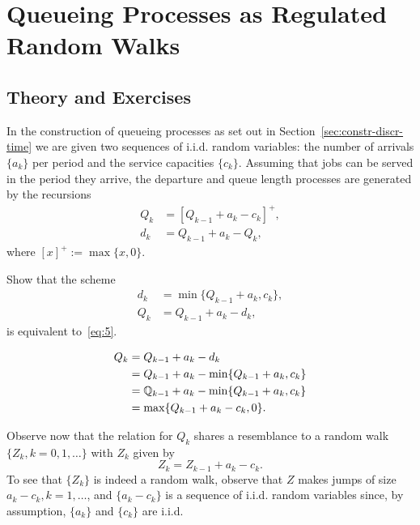 \section{Queueing Processes as Regulated Random Walks}
\label{sec:queu-proc-as}

\subsection*{Theory and Exercises}




In the construction of queueing processes as set out in
Section~\ref{sec:constr-discr-time} we are given two sequences of
i.i.d. random variables: the number of arrivals $\{a_k\}$ per period
and the service capacities $\{c_k\}$. Assuming that jobs can be served
in the period they arrive, the departure and queue length processes
are generated by the recursions
\begin{equation}\label{eq:5}
  \begin{split}
  Q_k &= [Q_{k-1}+a_k - c_k]^+,\\
  d_k &= Q_{k-1} +a_k- Q_{k},
  \end{split}
\end{equation}
where $[x]^+ := \max\{x, 0\}$.  

\begin{exercise}\label{ex:24}
  Show that the scheme
  \begin{align*}
    d_k &= \min\{Q_{k-1}+a_k, c_k\}, \\
    Q_k &= Q_{k-1} + a_k - d_k,
  \end{align*}
  is equivalent to~\eqref{eq:5}. 
\begin{solution}
  \begin{align*}
    Q_k &= Q_{k-1} + a_k - d_k \\ 
        &= Q_{k-1} + a_k - \min\{Q_{k-1}+a_k, c_k\} \\
        &= \mathbb{Q}_{k-1} + a_k - \min\{Q_{k-1}+a_k, c_k\} \\
        &= \max\{Q_{k-1} + a_k - c_k, 0 \}.
  \end{align*}
\end{solution}
\end{exercise}


Observe now that the relation for $Q_k$ shares a resemblance to a random walk $\{Z_k, k=0,1,\ldots\}$ with  $Z_k$ given by
\begin{equation}\label{eq:44}
  Z_k = Z_{k-1} + a_k - c_k.
\end{equation}
To see that $\{Z_k\}$ is indeed a random walk, observe that $Z$ makes  jumps of size $a_k-c_k, k=1,\ldots$, and $\{a_k-c_k\}$ is a sequence of i.i.d. random variables since, by assumption,  $\{a_k\}$ and $\{c_k\}$ are i.i.d.

